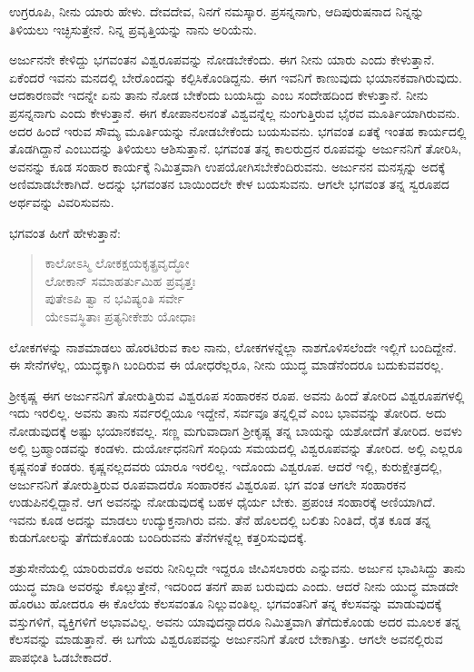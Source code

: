 {\small ಉಗ್ರರೂಪಿ, ನೀನು ಯಾರು ಹೇಳು. ದೇವದೇವ, ನಿನಗೆ ನಮಸ್ಕಾರ. ಪ್ರಸನ್ನನಾಗು, ಆದಿಪುರುಷನಾದ ನಿನ್ನನ್ನು ತಿಳಿಯಲು ಇಚ್ಛಿಸುತ್ತೇನೆ. ನಿನ್ನ ಪ್ರವೃತ್ತಿಯನ್ನು ನಾನು ಅರಿಯೆನು.}

ಅರ್ಜುನನೇ ಕೇಳಿದ್ದು ಭಗವಂತನ ವಿಶ್ವರೂಪವನ್ನು ನೋಡಬೇಕೆಂದು. ಈಗ ನೀನು ಯಾರು ಎಂದು ಕೇಳುತ್ತಾನೆ. ಏಕೆಂದರೆ ಇವನು ಮನದಲ್ಲಿ ಬೇರೊಂದನ್ನು ಕಲ್ಪಿಸಿಕೊಂಡಿದ್ದನು. ಈಗ ಇವನಿಗೆ ಕಾಣುವುದು ಭಯಾನಕವಾಗಿರುವುದು. ಆದಕಾರಣವೇ ಇದನ್ನೇ ಏನು ತಾನು ನೋಡ ಬೇಕೆಂದು ಬಯಸಿದ್ದು ಎಂಬ ಸಂದೇಹದಿಂದ ಕೇಳುತ್ತಾನೆ. ನೀನು ಪ್ರಸನ್ನನಾಗು ಎಂದು ಕೇಳುತ್ತಾನೆ. ಈಗ ಕೋಪಾನಲನಂತೆ ವಿಶ್ವವನ್ನೆಲ್ಲ ನುಂಗುತ್ತಿರುವ ಭೈರವ ಮೂರ್ತಿಯಾಗಿರುವನು. ಅದರ ಹಿಂದೆ ಇರುವ ಸೌಮ್ಯ ಮೂರ್ತಿಯನ್ನು ನೋಡಬೇಕೆಂದು ಬಯಸುವನು. ಭಗವಂತ ಏತಕ್ಕೆ ಇಂತಹ ಕಾರ್ಯದಲ್ಲಿ ತೊಡಗಿದ್ದಾನೆ ಎಂಬುದನ್ನು ತಿಳಿಯಲು ಆಶಿಸುತ್ತಾನೆ. ಭಗವಂತ ತನ್ನ ಕಾಲರುದ್ರನ ರೂಪವನ್ನು ಅರ್ಜುನನಿಗೆ ತೋರಿಸಿ, ಅವನನ್ನು ಕೂಡ ಸಂಹಾರ ಕಾರ್ಯಕ್ಕೆ ನಿಮಿತ್ತವಾಗಿ ಉಪಯೋಗಿಸಬೇಕೆಂದಿರುವನು. ಅರ್ಜುನನ ಮನಸ್ಸನ್ನು ಅದಕ್ಕೆ ಅಣಿಮಾಡಬೇಕಾಗಿದೆ. ಅದನ್ನು ಭಗವಂತನ ಬಾಯಿಂದಲೇ ಕೇಳ ಬಯಸುವನು. ಆಗಲೇ ಭಗವಂತ ತನ್ನ ಸ್ವರೂಪದ ಅರ್ಥವನ್ನು ವಿವರಿಸುವನು.

ಭಗವಂತ ಹೀಗೆ ಹೇಳುತ್ತಾನೆ:

\begin{verse}
ಕಾಲೋಽಸ್ಮಿ ಲೋಕಕ್ಷಯಕೃತ್ಪ್ರವೃದ್ಧೋ \\ ಲೋಕಾನ್ ಸಮಾಹರ್ತುಮಿಹ ಪ್ರವೃತ್ತಃ\\ಪುತೇಽಪಿ ತ್ವಾ ನ ಭವಿಷ್ಯಂತಿ ಸರ್ವೇ \\ ಯೇಽವಸ್ಥಿತಾಃ ಪ್ರತ್ಯನೀಕೇಶು ಯೋಧಾಃ 
\end{verse}

{\small ಲೋಕಗಳನ್ನು ನಾಶಮಾಡಲು ಹೊರಟಿರುವ ಕಾಲ ನಾನು, ಲೋಕಗಳನ್ನೆಲ್ಲಾ ನಾಶಗೊಳಿಸಲೆಂದೇ ಇಲ್ಲಿಗೆ ಬಂದಿದ್ದೇನೆ. ಈ ಸೇನೆಗಳೆಲ್ಲ, ಯುದ್ಧಕ್ಕಾಗಿ ಬಂದಿರುವ ಈ ಯೋಧರೆಲ್ಲರೂ, ನೀನು ಯುದ್ಧ ಮಾಡೆನೆಂದರೂ ಬದುಕುವವರಲ್ಲ. }

ಶ‍್ರೀಕೃಷ್ಣ ಈಗ ಅರ್ಜುನನಿಗೆ ತೋರುತ್ತಿರುವ ವಿಶ್ವರೂಪ ಸಂಹಾರಕನ ರೂಪ. ಅವನು ಹಿಂದೆ ತೋರಿದ ವಿಶ್ವರೂಪಗಳಲ್ಲಿ ಇದು ಇರಲಿಲ್ಲ. ಅವನು ತಾನು ಸರ್ವರಲ್ಲಿಯೂ ಇದ್ದೇನೆ, ಸರ್ವವೂ ತನ್ನಲ್ಲಿವೆ ಎಂಬ ಭಾವವನ್ನು ತೋರಿದ. ಅದು ನೋಡುವುದಕ್ಕೆ ಅಷ್ಟು ಭಯಾನಕವಲ್ಲ. ಸಣ್ಣ ಮಗುವಾದಾಗ ಶ‍್ರೀಕೃಷ್ಣ ತನ್ನ ಬಾಯನ್ನು ಯಶೋದೆಗೆ ತೋರಿದ. ಅವಳು ಅಲ್ಲಿ ಬ್ರಹ್ಮಾಂಡವನ್ನು ಕಂಡಳು. ದುರ್ಯೋಧನನಿಗೆ ಸಂಧಿಯ ಸಮಯದಲ್ಲಿ ವಿಶ್ವರೂಪವನ್ನು ತೋರಿದ. ಅಲ್ಲಿ ಎಲ್ಲರೂ ಕೃಷ್ಣನಂತೆ ಕಂಡರು. ಕೃಷ್ಣನಲ್ಲದವರು ಯಾರೂ ಇರಲಿಲ್ಲ. ಇದೊಂದು ವಿಶ್ವರೂಪ. ಆದರೆ ಇಲ್ಲಿ, ಕುರುಕ್ಷೇತ್ರದಲ್ಲಿ, ಅರ್ಜುನನಿಗೆ ತೋರುತ್ತಿರುವ ರೂಪವಾದರೊ ಸಂಹಾರಕನ ವಿಶ್ವರೂಪ. ಭಗ ವಂತ ಆಗಲೇ ಸಂಹಾರಕನ ಉಡುಪಿನಲ್ಲಿದ್ದಾನೆ. ಆಗ ಅವನನ್ನು ನೋಡುವುದಕ್ಕೆ ಬಹಳ ಧೈರ್ಯ ಬೇಕು. ಪ್ರಪಂಚ ಸಂಹಾರಕ್ಕೆ ಅಣಿಯಾಗಿದೆ. ಇವನು ಕೂಡ ಅದನ್ನು ಮಾಡಲು ಉದ್ಯುಕ್ತನಾಗಿರು ವನು. ತೆನೆ ಹೊಲದಲ್ಲಿ ಬಲಿತು ನಿಂತಿದೆ, ರೈತ ಕೂಡ ತನ್ನ ಕುಡುಗೋಲನ್ನು ತೆಗೆದುಕೊಂಡು ಬಂದಿರುವನು ತೆನೆಗಳನ್ನೆಲ್ಲ ಕತ್ತರಿಸುವುದಕ್ಕೆ.

ಶತ್ರುಸೇನೆಯಲ್ಲಿ ಯಾರಿರುವರೊ ಅವರು ನೀನಿಲ್ಲದೇ ಇದ್ದರೂ ಜೀವಿಸಲಾರರು ಎನ್ನುವನು. ಅರ್ಜುನ ಭಾವಿಸಿದ್ದು ತಾನು ಯುದ್ಧ ಮಾಡಿ ಅವರನ್ನು ಕೊಲ್ಲುತ್ತೇನೆ, ಇದರಿಂದ ತನಗೆ ಪಾಪ ಬರುವುದು ಎಂದು. ಆದರೆ ನೀನು ಯುದ್ಧ ಮಾಡದೇ ಹೊರಟು ಹೋದರೂ ಈ ಕೊಲೆಯ ಕೆಲಸವಂತೂ ನಿಲ್ಲುವಂತಿಲ್ಲ. ಭಗವಂತನಿಗೆ ತನ್ನ ಕೆಲಸವನ್ನು ಮಾಡುವುದಕ್ಕೆ ವಸ್ತುಗಳಿಗೆ, ವ್ಯಕ್ತಿಗಳಿಗೆ ಅಭಾವವಿಲ್ಲ. ಅವನು ಯಾವುದನ್ನಾದರೂ ನಿಮಿತ್ತವಾಗಿ ತೆಗೆದುಕೊಂಡು ಅದರ ಮೂಲಕ ತನ್ನ ಕೆಲಸವನ್ನು ಮಾಡುತ್ತಾನೆ. ಈ ಬಗೆಯ ವಿಶ್ವರೂಪವನ್ನು ಅರ್ಜುನನಿಗೆ ತೋರ ಬೇಕಾಗಿತ್ತು. ಆಗಲೇ ಅವನಲ್ಲಿರುವ ಪಾಪಭೀತಿ ಓಡಬೇಕಾದರೆ.

